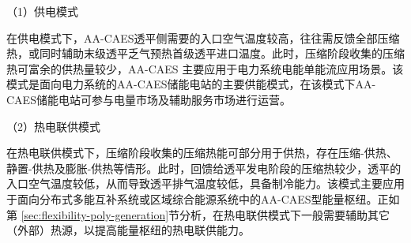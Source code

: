 （1）供电模式

 在供电模式下，AA-CAES透平侧需要的入口空气温度较高，往往需反馈全部压缩热，或同时辅助末级透平乏气预热首级透平进口温度。此时，压缩阶段收集的压缩热可富余的供热量较少，AA-CAES 主要应用于电力系统电能单能流应用场景。该模式是面向电力系统的AA-CAES储能电站的主要供能模式，在该模式下AA-CAES储能电站可参与电量市场及辅助服务市场进行运营。

（2）热电联供模式

在热电联供模式下，压缩阶段收集的压缩热能可部分用于供热，存在压缩-供热、静置-供热及膨胀-供热等情形。此时，回馈给透平发电阶段的压缩热较少，透平的入口空气温度较低，从而导致透平排气温度较低，具备制冷能力。该模式主要应用于面向分布式多能互补系统或区域综合能源系统中的AA-CAES型能量枢纽。正如第
\ref{sec:flexibility-poly-generation}节分析，在热电联供模式下一般需要辅助其它（外部）热源，以提高能量枢纽的热电联供能力。




